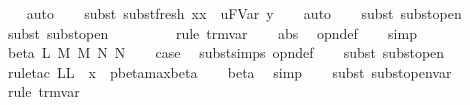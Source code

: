 \begin{isabellebody}
\ \ \isamarkupfalse%
\ auto{\isacharbrackleft}{}{\isacharbrackright}\isanewline
\ \ \isamarkupfalse%
\ {\isacharparenleft}subst{\isacharparenleft}{}{\isacharparenright}\ subst{\isacharunderscore}fresh{}{\isacharbrackleft}\ x{\isacharequal}x\ \ u{\isacharequal}{\isachardoublequoteopen}FVar\ y{\isachardoublequoteclose}{\isacharbrackright}{\isacharparenright}\isanewline
\ \ \isamarkupfalse%
\ auto{\isacharbrackleft}{}{\isacharbrackright}\isanewline
\ \ \isamarkupfalse%
\ {\isacharparenleft}subst\ subst{\isacharunderscore}open{}{\isacharparenright}\isanewline
\ \ \isamarkupfalse%
\isanewline
\ \ \isamarkupfalse%
\ {\isacharparenleft}subst\ subst{\isacharunderscore}open{}{\isacharparenright}\isanewline
\ \ \isamarkupfalse%
\isanewline
\ \ \isamarkupfalse%
\isanewline
\ \ \isamarkupfalse%
\ {\isacharparenleft}rule\ trm{\isachardot}var{\isacharparenright}\isanewline
\ \ \isamarkupfalse%
\ abs\ \isamarkupfalse%
\ opn{\isacharprime}{\isacharunderscore}def\isanewline
\ \ \isamarkupfalse%
\ simp\isanewline
\ \isamarkupfalse%
\isanewline
{}\isamarkupfalse%
\ {\isacharparenleft}beta\ L\ M\ M{\isacharprime}\ N\ N{\isacharprime}{\isacharparenright}\isanewline
\ \ \isamarkupfalse%
\ {\isacharquery}case\ \isamarkupfalse%
\ subst{\isachardot}simps\ opn{\isacharprime}{\isacharunderscore}def\isanewline
\ \ \isamarkupfalse%
\ {\isacharparenleft}subst\ subst{\isacharunderscore}open{\isacharparenright}\isanewline
\ \ \isamarkupfalse%
\isanewline
\ \ \isamarkupfalse%
\ {\isacharparenleft}rule{\isacharunderscore}tac\ L{\isacharequal}{\isachardoublequoteopen}L\ {\isasymunion}\ {\isacharbraceleft}x{\isacharbraceright}{\isachardoublequoteclose}\ \ pbeta{\isacharunderscore}max{\isacharunderscore}beta{\isacharprime}{\isacharparenright}\isanewline
\ \ \isamarkupfalse%
\ beta\ \isamarkupfalse%
\ simp\isanewline
\ \ \isamarkupfalse%
\ {\isacharparenleft}subst\ subst{\isacharunderscore}open{\isacharunderscore}var{}{\isacharparenright}\isanewline
\ \ \isamarkupfalse%
\ {\isacharparenleft}rule\ trm{\isachardot}var{\isacharparenright}\isanewline
\ \ \isamarkupfalse%

\end{isabellebody}
